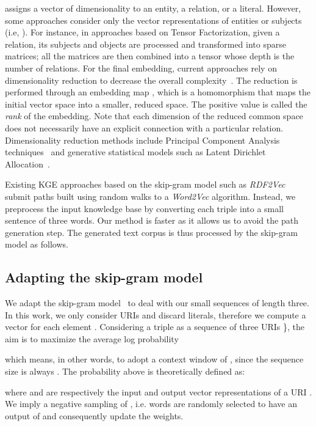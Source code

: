 \documentclass[graybox]{archivesofdatascience}
\newcommand{\wtv}{\textit{Word2Vec}\xspace}
\newcommand{\rtv}{\textit{RDF2Vec}\xspace}
\begin{document}
assigns a vector of dimensionality  to an entity, a relation, or a literal.
However, some approaches consider only the vector representations of entities or subjects (i.e, ).
For instance, in approaches based on Tensor Factorization, given a relation, its subjects and objects are processed and transformed into sparse matrices; all the matrices are then combined into a tensor whose depth is the number of relations.
For the final embedding, current approaches rely on dimensionality reduction to decrease the overall complexity~\citep{nickel2014reducing,TransA/jia2015locally,TransR/lin2015learning}.
The reduction is performed through an embedding map , which is a homomorphism that maps the initial vector space into a smaller, reduced space.
The positive value  is called the \textit{rank} of the embedding.
Note that each dimension of the reduced common space does not necessarily have an explicit connection with a particular relation.
Dimensionality reduction methods include Principal Component Analysis techniques~\citep{nickel2014reducing} and generative statistical models such as Latent Dirichlet Allocation~\citep{Sspace/jurgens2010s,Gensim/rehurek_lrec}.


Existing KGE approaches based on the skip-gram model such as \rtv~\citep{ristoski2016rdf2vec} submit paths built using random walks to a \wtv algorithm.
Instead, we preprocess the input knowledge base by converting each triple into a small sentence of three words.
Our method is faster as it allows us to avoid the path generation step.
The generated text corpus is thus processed by the skip-gram model as follows.

\subsection{Adapting the skip-gram model}

We adapt the skip-gram model~\citep{mikolov2013distributed} to deal with our small sequences of length three.
In this work, we only consider URIs and discard literals, therefore we compute a vector for each element .
Considering a triple as a sequence of three URIs \}, the aim is to maximize the average log probability

which means, in other words, to adopt a context window of , since the sequence size is always .
The probability above is theoretically defined as:

where  and  are respectively the input and output vector representations of a URI .
We imply a negative sampling of , i.e.  words are randomly selected to have an output of  and consequently update the weights.
\end{document}
